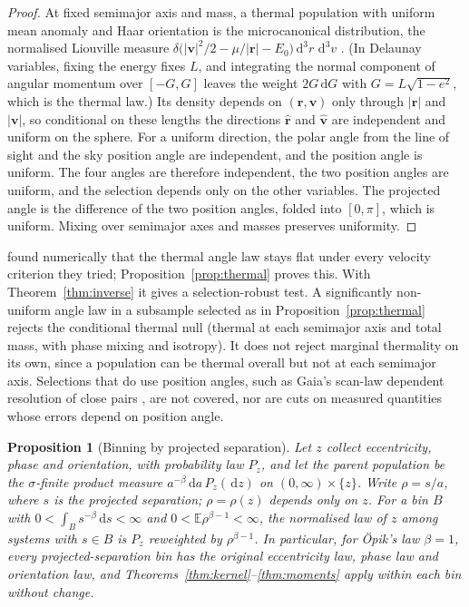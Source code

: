 \documentclass[11pt,a4paper]{article}
\newtheorem{proposition}[theorem]{Proposition}
\theoremstyle{remark}\newtheorem{remark}[theorem]{Remark}
\newcommand{\E}{\mathbb E}
\newcommand{\dd}{\,\mathrm d}
\begin{document}
\begin{proof}
At fixed semimajor axis and mass, a thermal population with uniform mean anomaly and Haar orientation is the microcanonical distribution, the normalised Liouville measure $\delta\big(|\bm v|^2/2-\mu/|\bm r|-E_0\big)\dd^3r\,\dd^3v$ \citep{Jeans1919,Hwang2022}. (In Delaunay variables, fixing the energy fixes $L$, and integrating the normal component of angular momentum over $[-G,G]$ leaves the weight $2G\dd G$ with $G=L\sqrt{1-e^2}$, which is the thermal law.) Its density depends on $(\bm r,\bm v)$ only through $|\bm r|$ and $|\bm v|$, so conditional on these lengths the directions $\widehat{\bm r}$ and $\widehat{\bm v}$ are independent and uniform on the sphere. For a uniform direction, the polar angle from the line of sight and the sky position angle are independent, and the position angle is uniform. The four angles are therefore independent, the two position angles are uniform, and the selection depends only on the other variables. The projected angle is the difference of the two position angles, folded into $[0,\pi]$, which is uniform. Mixing over semimajor axes and masses preserves uniformity.
\end{proof}

\citet{Hwang2022} found numerically that the thermal angle law stays flat under every velocity criterion they tried; Proposition~\ref{prop:thermal} proves this. With Theorem~\ref{thm:inverse} it gives a selection-robust test. A significantly non-uniform angle law in a subsample selected as in Proposition~\ref{prop:thermal} rejects the conditional thermal null (thermal at each semimajor axis and total mass, with phase mixing and isotropy). It does not reject marginal thermality on its own, since a population can be thermal overall but not at each semimajor axis. Selections that do use position angles, such as Gaia's scan-law dependent resolution of close pairs \citep{Hwang2022}, are not covered, nor are cuts on measured quantities whose errors depend on position angle.

\begin{proposition}[Binning by projected separation]\label{prop:sbin}
Let $z$ collect eccentricity, phase and orientation, with probability law $P_z$, and let the parent population be the $\sigma$-finite product measure $a^{-\beta}\dd a\,P_z(\dd z)$ on $(0,\infty)\times\{z\}$. Write $\rho=s/a$, where $s$ is the projected separation; $\rho=\rho(z)$ depends only on $z$. For a bin $B$ with $0<\int_Bs^{-\beta}\dd s<\infty$ and $0<\E\rho^{\beta-1}<\infty$, the normalised law of $z$ among systems with $s\in B$ is $P_z$ reweighted by $\rho^{\beta-1}$. In particular, for \"Opik's law $\beta=1$, every projected-separation bin has the original eccentricity law, phase law and orientation law, and Theorems~\ref{thm:kernel}--\ref{thm:moments} apply within each bin without change.
\end{proposition}
\end{document}
